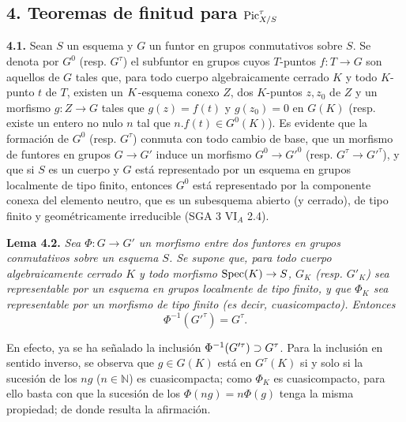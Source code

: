 
\subsection*{4. Teoremas de finitud para $\Pic^\tau_{X/S}$}

\textbf{4.1.} Sean \(S\) un esquema y \(G\) un funtor en grupos conmutativos
sobre \(S\). Se denota por \(G^0\) (resp. \(G^\tau\)) el subfuntor en grupos
cuyos \(T\)-puntos \(f:T\to G\) son aquellos de \(G\) tales que, para todo
cuerpo algebraicamente cerrado \(K\) y todo \(K\)-punto \(t\) de \(T\),
existen un \(\sisi{k}{K}\)-esquema conexo \(Z\), dos \(K\)-puntos \(z,z_0\) de \(Z\) y %
un morfismo \(g:Z\to G\) tales que \(g(z)=f(t)\) y \(g(z_0)=0\) en \(G(K)\)
(resp. existe un entero no nulo \(n\) tal que \(n.f(t)\in G^0(K)\)). Es
evidente que la formación de \(G^0\) (resp. \(G^\tau\)) conmuta con todo
cambio de base, que un morfismo de funtores en grupos \(G\to G'\) induce un
morfismo \(G^0\to G'^0\) (resp. \(G^\tau\to G'^\tau\)), y que si \(S\) es un
cuerpo y \(G\) está representado por un esquema en grupos localmente de tipo
finito, entonces \(G^0\) está representado por la componente conexa del
elemento neutro, que es un subesquema abierto (y cerrado), de tipo finito y
geométricamente irreducible (SGA 3 VI\(_A\) 2.4).

\textbf{Lema 4.2.} \emph{Sea \(\Phi:G\to G'\) un morfismo entre dos funtores
en grupos conmutativos sobre un esquema \(S\). Se supone que, para todo cuerpo
algebraicamente cerrado \(K\) y todo morfismo \(\Spec(K)\to S\), \(G_K\)
(resp. \(G'_K\)) sea representable por un esquema en grupos localmente de
tipo finito, y que \(\Phi_K\) sea representable por un morfismo de tipo finito
(es decir, cuasicompacto). Entonces}
\[
  \Phi^{-1}(G'^\tau)=G^\tau.
\]

En efecto, ya se ha señalado la inclusión
\(\sisi{\Phi(G'^\tau)}{\Phi^{-1}(G'^\tau)}\supset G^\tau\). Para la inclusión en sentido inverso, se %
observa que \(g\in G(K)\) está en \(G^\tau(K)\) si y solo si la sucesión de
los \(ng\) (\(n\in\mathbb N\)) es cuasicompacta; como \(\Phi_K\) es
cuasicompacto, para ello basta con que la sucesión de los
\(\Phi(ng)=n\Phi(g)\) tenga la misma propiedad; de donde resulta la
afirmación.

